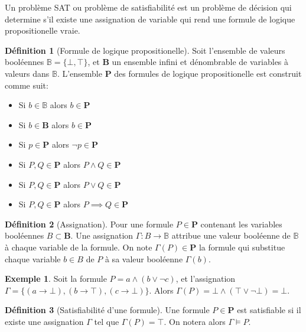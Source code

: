 \documentclass[french, 12pt, letterpaper]{article}
\theoremstyle{definition}
\newtheorem{definition}{Définition}[subsection]
\theoremstyle{proposition}
\theoremstyle{example}
\newtheorem{example}{Exemple}[definition]
\begin{document}
    Un problème SAT ou problème de satisfiabilité est un problème de décision qui determine s'il existe une assignation de variable
    qui rend une formule de logique propositionelle vraie.

    \begin{definition}[Formule de logique propositionelle]
        Soit l'ensemble de valeurs booléennes $\mathbb{B} = \{\bot, \top\}$, et $\mathbf{B}$ un ensemble infini et dénombrable de variables à valeurs dans $\mathbb{B}$.
        L'ensemble $\mathbf{P}$ des formules de logique propositionelle est construit comme suit:
        \begin{itemize}
            \item Si $b \in \mathbb{B}$ alors $b \in \mathbf{P}$
            \item Si $b \in \mathbf{B}$ alors $b \in \mathbf{P}$
            \item Si $p \in \mathbf{P}$ alors $\lnot p \in \mathbf{P}$
            \item Si $P, Q \in \mathbf{P}$ alors $P \land Q \in \mathbf{P}$
            \item Si $P, Q \in \mathbf{P}$ alors $P \lor Q \in \mathbf{P}$
            \item Si $P, Q \in \mathbf{P}$ alors $P \implies Q \in \mathbf{P}$
        \end{itemize}
    \end{definition}

    \begin{definition}[Assignation]
        Pour une formule $P \in \mathbf{P}$ contenant les variables booléennes $B \subset \mathbf{B}$.
        Une assignation $\Gamma : B \rightarrow \mathbb{B}$ attribue une valeur booléenne de $\mathbb{B}$ à chaque variable de la formule.
        On note $\Gamma(P) \in \mathbf{P}$ la formule qui substitue chaque variable $b \in B$ de $P$ à sa valeur booléenne $\Gamma(b)$.
    \end{definition}
    \begin{example}
        Soit la formule $P = a \land (b \lor \lnot c)$, et l'assignation $\Gamma = \{(a \rightarrow \bot), (b \rightarrow \top), (c \rightarrow \bot)\}$.
        Alors $\Gamma(P) = \bot \land (\top \lor \lnot \bot) = \bot$.
    \end{example}

    \begin{definition}[Satisfiabilité d'une formule]
        Une formule $P \in \mathbf{P}$ est satisfiable si il existe une assignation $\Gamma$ tel que $\Gamma(P) = \top$.
        On notera alors $\Gamma \vDash P$.
    \end{definition}
\end{document}
